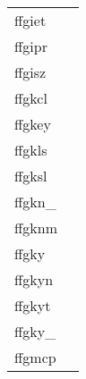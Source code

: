 \documentclass[11pt]{book}
\begin{document}
\begin{tabular}{lr}
ffgiet & \pageref{ffgidt} \\
ffgipr & \pageref{ffgipr} \\
ffgisz & \pageref{ffgisz} \\
ffgkcl      & \pageref{ffgkcl} \\
ffgkey      & \pageref{ffgkey} \\
ffgkls  & \pageref{ffgkls} \\
ffgksl  & \pageref{ffgksl} \\
ffgkn\_     & \pageref{ffgknx} \\
ffgknm    & \pageref{ffgknm} \\
ffgky          & \pageref{ffgky} \\
ffgkyn         & \pageref{ffgkyn} \\
ffgkyt   & \pageref{ffgkyt} \\
ffgky\_      & \pageref{ffgkyx} \\
ffgmcp   & \pageref{ffgmcp} \\

\end{tabular}
\end{document}
